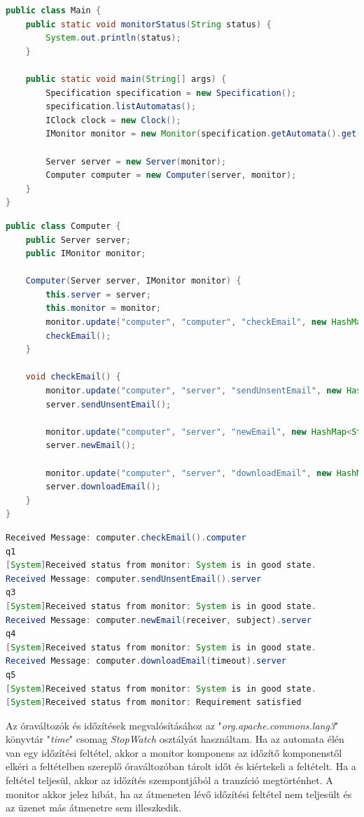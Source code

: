 \begin{lstlisting}[language=java, frame=single, float=ht!, caption={Időzítéses példához tartozó \textit{Main} osztály.},captionpos=b,label=computer_main]
public class Main {
	public static void monitorStatus(String status) {
		System.out.println(status);
	}

	public static void main(String[] args) {
		Specification specification = new Specification();
		specification.listAutomatas();
		IClock clock = new Clock();
		IMonitor monitor = new Monitor(specification.getAutomata().get(0), clock);

		Server server = new Server(monitor);
		Computer computer = new Computer(server, monitor);
	}
}
\end{lstlisting}

\begin{lstlisting}[language=java, frame=single, float=ht!, caption={\textit{Computer} \textit{Java} osztály.},captionpos=b,label=computer_java]
public class Computer {
	public Server server;
	public IMonitor monitor;

	Computer(Server server, IMonitor monitor) {
		this.server = server;
		this.monitor = monitor;
		monitor.update("computer", "computer", "checkEmail", new HashMap<String, Object>());
		checkEmail();
	}

	void checkEmail() {
		monitor.update("computer", "server", "sendUnsentEmail", new HashMap<String, Object>());
		server.sendUnsentEmail();

		monitor.update("computer", "server", "newEmail", new HashMap<String, Object>());
		server.newEmail();

		monitor.update("computer", "server", "downloadEmail", new HashMap<String, Object>());
		server.downloadEmail();
	}
}
\end{lstlisting}

\begin{lstlisting}[language=java, frame=single, float=ht!, caption={Időzítéses példa monitor kimenete.},captionpos=b,label=computer_monitor]
Received Message: computer.checkEmail().computer
q1
[System]Received status from monitor: System is in good state.
Received Message: computer.sendUnsentEmail().server
q3
[System]Received status from monitor: System is in good state.
Received Message: computer.newEmail(receiver, subject).server
q4
[System]Received status from monitor: System is in good state.
Received Message: computer.downloadEmail(timeout).server
q5
[System]Received status from monitor: System is in good state.
[System]Received status from monitor: Requirement satisfied
\end{lstlisting}

Az óraváltozók és időzítések megvalósításához az "\textit{org.apache.commons.lang3}" \cite{Maven} könyvtár "\textit{time}" csomag \textit{StopWatch} osztályát használtam.
Ha az automata élén van egy időzítési feltétel, akkor a monitor komponens az időzítő komponenstől elkéri a feltételben szereplő óraváltozóban tárolt időt és kiértekeli a feltételt.
Ha a feltétel teljesül, akkor az időzítés szempontjából a tranzíció megtörténhet.
A monitor akkor jelez hibát, ha az átmeneten lévő időzítési feltétel nem teljesült és az üzenet más átmenetre sem illeszkedik.